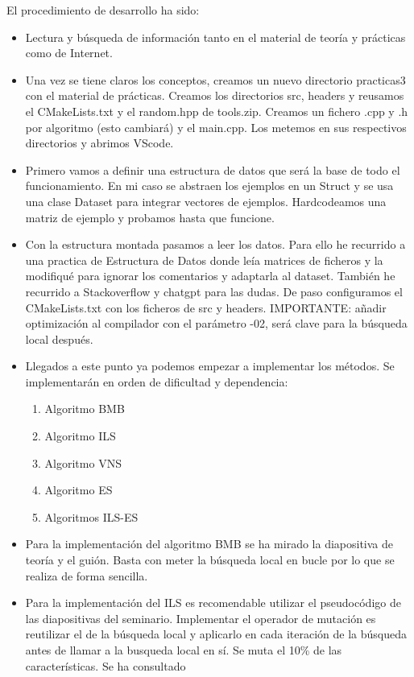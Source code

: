 El procedimiento de desarrollo ha sido:
\begin{itemize}
	\item Lectura y búsqueda de información tanto en el material de teoría y prácticas como de Internet.

	\item Una vez se tiene claros los conceptos, creamos un nuevo directorio practicas3 con el material de prácticas. Creamos los directorios src, headers y reusamos el CMakeLists.txt y el random.hpp de tools.zip. Creamos un fichero .cpp y .h por algoritmo (esto cambiará) y el main.cpp. Los metemos en sus respectivos directorios y abrimos VScode.
	
	\item Primero vamos a definir una estructura de datos que será la base de todo el funcionamiento. En mi caso se abstraen los ejemplos en un Struct y se usa una clase Dataset para integrar vectores de ejemplos. Hardcodeamos una matriz de ejemplo y probamos hasta que funcione.
	
	\item Con la estructura montada pasamos a leer los datos. Para ello he recurrido a una practica de Estructura de Datos donde leía matrices de ficheros y la modifiqué para ignorar los comentarios y adaptarla al dataset.
	También he recurrido a Stackoverflow y chatgpt para las dudas. De paso configuramos el CMakeLists.txt con los ficheros de src y headers. IMPORTANTE: añadir optimización al compilador con el parámetro -02, será clave para la búsqueda local después.
	
	\item Llegados a este punto ya podemos empezar a implementar los métodos. Se implementarán en orden de dificultad y dependencia:
	\begin{enumerate}
		\item Algoritmo BMB
		\item Algoritmo ILS
		\item Algoritmo VNS
		\item Algoritmo ES
		\item Algoritmos ILS-ES
	\end{enumerate}
	
	\item Para la implementación del algoritmo BMB se ha mirado la diapositiva de teoría y el guión. Basta con meter la búsqueda local en bucle por lo que se realiza de forma sencilla.
	
	\item Para la implementación del ILS es recomendable utilizar el pseudocódigo de las diapositivas del seminario. Implementar el operador de mutación es reutilizar el de la búsqueda local y aplicarlo en cada iteración de la búsqueda antes de llamar a la busqueda local en sí. Se muta el 10\% de las características. Se ha consultado \cite{ull}
	

\end{itemize}
